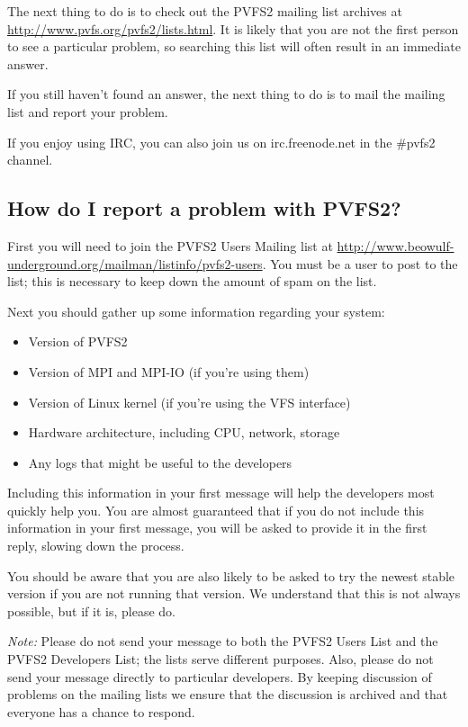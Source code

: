 \documentclass[11pt,letterpaper]{article}
\begin{document}
The next thing to do is to check out the PVFS2 mailing list archives at
\url{http://www.pvfs.org/pvfs2/lists.html}.  It is likely that you are not
the first person to see a particular problem, so searching this list will
often result in an immediate answer.

If you still haven't found an answer, the next thing to do is to mail the
mailing list and report your problem.

If you enjoy using IRC, you can also join us on irc.freenode.net in
the \#pvfs2 channel.

\subsection{How do I report a problem with PVFS2?}

First you will need to join the PVFS2 Users Mailing list at
\url{http://www.beowulf-underground.org/mailman/listinfo/pvfs2-users}.  You
must be a user to post to the list; this is necessary to keep down the amount
of spam on the list.

Next you should gather up some information regarding your system:
\begin{itemize}
\item Version of PVFS2
\item Version of MPI and MPI-IO (if you're using them)
\item Version of Linux kernel (if you're using the VFS interface)
\item Hardware architecture, including CPU, network, storage
\item Any logs that might be useful to the developers
\end{itemize}
Including this information in your first message will help the developers most
quickly help you.  You are almost guaranteed that if you do not include this
information in your first message, you will be asked to provide it in the
first reply, slowing down the process.

You should be aware that you are also likely to be asked to try the newest
stable version if you are not running that version.  We understand that this
is not always possible, but if it is, please do.

\emph{Note:} Please do not send your message to both the PVFS2 Users List and
the PVFS2 Developers List; the lists serve different purposes.  Also, please
do not send your message directly to particular developers.  By keeping
discussion of problems on the mailing lists we ensure that the discussion is
archived and that everyone has a chance to respond.
\end{document}
